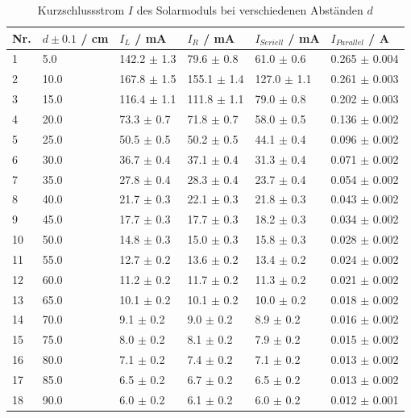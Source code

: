 \documentclass[12pt,a4paper,twoside]{article}
\begin{document}
\begin{table}[H]
    \centering
    \caption{Kurzschlussstrom $I$ des Solarmoduls bei verschiedenen Abständen $d$}
    \label{tab:Messdaten Strom Solar}
    \begin{tabular}{| l | l | l | l | l | l |}
        \hline
        Nr. & $d \pm 0.1 $ / cm & $I_{L}$ / mA & $I_{R}$ / mA & $I_{Seriell}$ / mA & $I_{Parallel}$ / A \\
        \hline
        1  & 5.0  & 142.2 $\pm$ 1.3  & 79.6  $\pm$ 0.8 & 61.0  $\pm$ 0.6 & 0.265 $\pm$ 0.004  \\
        2  & 10.0 & 167.8 $\pm$ 1.5  & 155.1 $\pm$ 1.4 & 127.0 $\pm$ 1.1 & 0.261 $\pm$ 0.003  \\
        3  & 15.0 & 116.4 $\pm$ 1.1  & 111.8 $\pm$ 1.1 & 79.0  $\pm$ 0.8 & 0.202 $\pm$ 0.003  \\
        4  & 20.0 &  73.3 $\pm$ 0.7  & 71.8  $\pm$ 0.7 & 58.0  $\pm$ 0.5 & 0.136 $\pm$ 0.002  \\
        5  & 25.0 &  50.5 $\pm$ 0.5  & 50.2  $\pm$ 0.5 & 44.1  $\pm$ 0.4 & 0.096 $\pm$ 0.002  \\
        6  & 30.0 &  36.7 $\pm$ 0.4  & 37.1  $\pm$ 0.4 & 31.3  $\pm$ 0.4 & 0.071 $\pm$ 0.002  \\
        7  & 35.0 &  27.8 $\pm$ 0.4  & 28.3  $\pm$ 0.4 & 23.7  $\pm$ 0.4 & 0.054 $\pm$ 0.002  \\
        8  & 40.0 &  21.7 $\pm$ 0.3  & 22.1  $\pm$ 0.3 & 21.8  $\pm$ 0.3 & 0.043 $\pm$ 0.002  \\
        9  & 45.0 &  17.7 $\pm$ 0.3  & 17.7  $\pm$ 0.3 & 18.2  $\pm$ 0.3 & 0.034 $\pm$ 0.002  \\
        10 & 50.0 &  14.8 $\pm$ 0.3  & 15.0  $\pm$ 0.3 & 15.8  $\pm$ 0.3 & 0.028 $\pm$ 0.002  \\
        11 & 55.0 &  12.7 $\pm$ 0.2  & 13.6  $\pm$ 0.2 & 13.4  $\pm$ 0.2 & 0.024 $\pm$ 0.002  \\
        12 & 60.0 &  11.2 $\pm$ 0.2  & 11.7  $\pm$ 0.2 & 11.3  $\pm$ 0.2 & 0.021 $\pm$ 0.002  \\
        13 & 65.0 &  10.1 $\pm$ 0.2  & 10.1  $\pm$ 0.2 & 10.0  $\pm$ 0.2 & 0.018 $\pm$ 0.002  \\
        14 & 70.0 &   9.1 $\pm$ 0.2  & 9.0   $\pm$ 0.2 & 8.9   $\pm$ 0.2 & 0.016 $\pm$ 0.002  \\
        15 & 75.0 &   8.0 $\pm$ 0.2  & 8.1   $\pm$ 0.2 & 7.9   $\pm$ 0.2 & 0.015 $\pm$ 0.002  \\
        16 & 80.0 &   7.1 $\pm$ 0.2  & 7.4   $\pm$ 0.2 & 7.1   $\pm$ 0.2 & 0.013 $\pm$ 0.002  \\
        17 & 85.0 &   6.5 $\pm$ 0.2  & 6.7   $\pm$ 0.2 & 6.5   $\pm$ 0.2 & 0.013 $\pm$ 0.002  \\
        18 & 90.0 &   6.0 $\pm$ 0.2  & 6.1   $\pm$ 0.2 & 6.0   $\pm$ 0.2 & 0.012 $\pm$ 0.001  \\
        \hline  
    \end{tabular}
\end{table}
\end{document}

